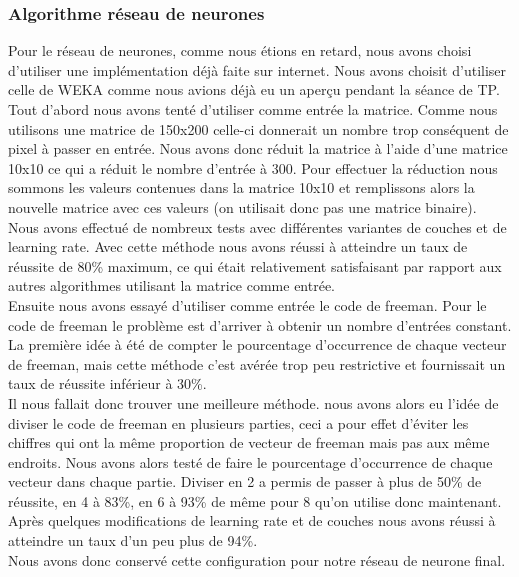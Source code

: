 \documentclass[10pt,a4paper]{report}
\begin{document}
\subsubsection{Algorithme réseau de neurones}
\begin{flushleft}

Pour le réseau de neurones, comme nous étions en retard, nous avons choisi d'utiliser une implémentation déjà faite sur internet. Nous avons choisit d'utiliser celle de WEKA comme nous avions déjà eu un aperçu pendant la séance de TP.\\
\vspace*{0.3cm}
Tout d'abord nous avons tenté d'utiliser comme entrée la matrice. Comme nous utilisons une matrice de 150x200 celle-ci donnerait un nombre trop conséquent de pixel à passer en entrée. Nous avons donc réduit la matrice à l'aide d'une matrice 10x10 ce qui a réduit le nombre d'entrée à 300. Pour effectuer la réduction nous sommons les valeurs contenues dans la matrice 10x10 et remplissons alors la nouvelle matrice avec ces valeurs (on utilisait donc pas une matrice binaire).\\
Nous avons effectué de nombreux tests avec différentes variantes de couches et de learning rate. Avec cette méthode nous avons réussi à atteindre un taux de réussite de 80\% maximum, ce qui était relativement satisfaisant par rapport aux autres algorithmes utilisant la matrice comme entrée.\\
\vspace*{0.3cm}
Ensuite nous avons essayé d'utiliser comme entrée le code de freeman. Pour le code de freeman le problème est d'arriver à obtenir un nombre d'entrées constant. La première idée à été de compter le pourcentage d'occurrence de chaque vecteur de freeman, mais cette méthode c'est avérée trop peu restrictive et fournissait un taux de réussite inférieur à 30\%.\\
Il nous fallait donc trouver une meilleure méthode. nous avons alors eu l'idée de diviser le code de freeman en plusieurs parties, ceci a pour effet d'éviter les chiffres qui ont la même proportion de vecteur de freeman mais pas aux même endroits. Nous avons alors testé de faire le pourcentage d'occurrence de chaque vecteur dans chaque partie. Diviser en 2 a permis de passer à plus de 50\% de réussite, en 4 à 83\%, en 6 à 93\% de même pour 8 qu'on utilise donc maintenant. Après quelques modifications de learning rate et de couches nous avons réussi à atteindre un taux d'un peu plus de 94\%.\\
Nous avons donc conservé cette configuration pour notre réseau de neurone final.

\end{flushleft}
\end{document}
